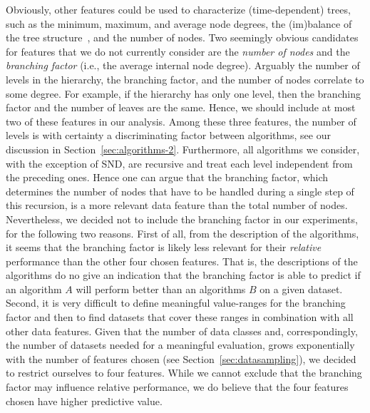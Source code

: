 Obviously, other features could be used to characterize (time-dependent) trees, such as the minimum, maximum, and average node degrees, the (im)balance of the tree structure~\citep{boorman73,kuhner14}, and the number of nodes. Two seemingly obvious candidates for features that we do not currently consider are the \emph{number of nodes} and the \emph{branching factor} (i.e., the average internal node degree). Arguably the number of levels in the hierarchy, the branching factor, and the number of nodes correlate to some degree. For example, if the hierarchy has only one level, then the branching factor and the number of leaves are the same. Hence, we should include at most two of these features in our analysis. Among these three features, the number of levels is with certainty a discriminating factor between algorithms, see our discussion in Section~\ref{sec:algorithms-2}. Furthermore, all algorithms we consider, with the exception of SND, are recursive and treat each level independent from the preceding ones. Hence one can argue that the branching factor, which determines the number of nodes that have to be handled during a single step of this recursion, is a more relevant data feature than the total number of nodes. Nevertheless, we decided not to include the branching factor in our experiments, for the following two reasons. First of all, from the description of the algorithms, it seems that the branching factor is likely less relevant for their \emph{relative} performance than the other four chosen features. That is, the descriptions of the algorithms do no give an indication that the branching factor is able to predict if an algorithm $A$ will perform better than an algorithms $B$ on a given dataset. Second, it is very difficult to define  meaningful value-ranges for the branching factor and then to find datasets that cover these ranges in combination with all other data features. Given that the number of data classes and, correspondingly, the number of datasets needed for a meaningful evaluation, grows exponentially with the number of features chosen (see Section~\ref{sec:datasampling}), we decided to restrict ourselves to four features. While we cannot exclude that the branching factor may influence relative performance, we do believe that the four features chosen have higher predictive value.


